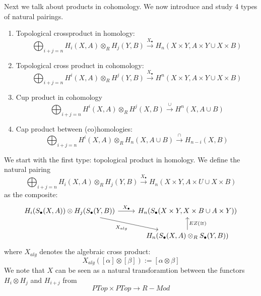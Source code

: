 Next we talk about products in cohomology. We now introduce and study 4 types of natural pairings.
\begin{enumerate}
    \item Topological crossproduct in homology:
    \begin{equation*}
        \bigoplus_{i+j=n}H_i(X,A)\otimes_R H_j(Y,B)\xrightarrow{X_\bullet}H_n(X\times Y, A\times Y\cup X\times B)
    \end{equation*}
    \item Topological cross product in cohomology:
    \begin{equation*}
        \bigoplus_{i+j=n}H^i(X,A)\otimes_R H^j(Y,B)\xrightarrow{X_\bullet}H^n(X\times Y, A\times Y\cup X\times B)
    \end{equation*}
    \item Cup product in cohomology 
    \begin{equation*}
        \bigoplus_{i+j=n}H^i(X,A)\otimes_R H^j(X,B)\xrightarrow{\cup} H^n(X,A\cup B)
    \end{equation*}
    \item Cap product between (co)homologies:
    \begin{equation*}
        \bigoplus_{i+j=n}H^i(X,A)\otimes_R H_n(X,A\cup B)\xrightarrow{\cap} H_{n-i}(X,B)
    \end{equation*}
\end{enumerate}

We start with the first type: topological product in homology. We define the natural pairing
\begin{equation*}
    \bigoplus_{i+j=n}H_i(X,A)\otimes_R H_j(Y,B)\xrightarrow{X_\bullet}H_n(X\times Y, A\times U\cup X\times B)
\end{equation*}
as the composite:
\[\begin{tikzcd}
	{H_i(S_\bullet(X,A))\otimes H_j(S_\bullet(Y,B))} & {H_n(S_\bullet(X\times Y, X\times B\cup A\times Y))} \\
	& {H_n(S_\bullet(X,A)\otimes_R S_\bullet(Y,B))}
	\arrow["{X_\bullet}", from=1-1, to=1-2]
	\arrow["{X_{alg}}"', from=1-1, to=2-2]
	\arrow["{EZ(\cong)}"', from=2-2, to=1-2]
\end{tikzcd}\]
where $X_{alg}$ denotes the algebraic cross product:
\begin{equation*}
    X_{alg}([\alpha]\otimes[\beta]):=[\alpha\otimes\beta]
\end{equation*}
We note that $X$ can be seen as a natural transforamtion between the functors $H_i\otimes H_j$ and $H_{i+j}$ from 
\begin{equation*}
    PTop\times PTop\to R-Mod
\end{equation*}

